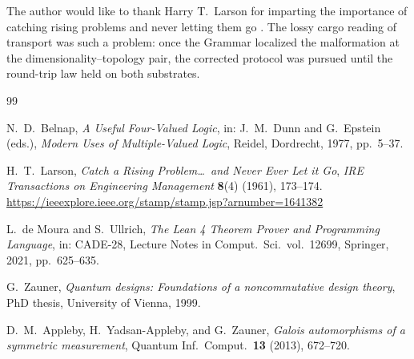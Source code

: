 \documentclass[12pt,a4paper]{article}
\begin{document}
The author would like to thank Harry T.\ Larson for imparting the importance
of catching rising problems and never letting them go \cite{Larson1961}.
The lossy cargo reading of transport was such a problem: once the Grammar
localized the malformation at the dimensionality--topology pair, the corrected
protocol was pursued until the round-trip law held on both substrates.

\begin{thebibliography}{99}

N.\ D.\ Belnap,
\textit{A Useful Four-Valued Logic},
in: J.\ M.\ Dunn and G.\ Epstein (eds.), \textit{Modern Uses of Multiple-Valued Logic},
Reidel, Dordrecht, 1977, pp.\ 5--37.

H.\ T.\ Larson,
\textit{Catch a Rising Problem\ldots\ and Never Ever Let it Go},
\emph{IRE Transactions on Engineering Management} \textbf{8}(4) (1961), 173--174.
\url{https://ieeexplore.ieee.org/stamp/stamp.jsp?arnumber=1641382}

L.\ de Moura and S.\ Ullrich,
\textit{The Lean 4 Theorem Prover and Programming Language},
in: CADE-28, Lecture Notes in Comput.\ Sci.\ vol.\ 12699, Springer, 2021, pp.\ 625--635.

G.\ Zauner,
\textit{Quantum designs: Foundations of a noncommutative design theory},
PhD thesis, University of Vienna, 1999.

D.\ M.\ Appleby, H.\ Yadsan-Appleby, and G.\ Zauner,
\textit{Galois automorphisms of a symmetric measurement},
Quantum Inf.\ Comput.\ \textbf{13} (2013), 672--720.

\end{thebibliography}
\end{document}
